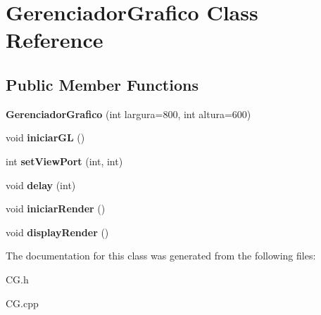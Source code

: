 \hypertarget{classGerenciadorGrafico}{\section{Gerenciador\-Grafico Class Reference}
\label{classGerenciadorGrafico}
}
\subsection*{Public Member Functions}
\begin{DoxyCompactItemize}
\item 
\hypertarget{classGerenciadorGrafico_a0213dce4e0ea77b2b1b2ee4833f9ef5c}{{\bfseries Gerenciador\-Grafico} (int largura=800, int altura=600)}\label{classGerenciadorGrafico_a0213dce4e0ea77b2b1b2ee4833f9ef5c}

\item 
\hypertarget{classGerenciadorGrafico_a880153d59789958ae68cebe650a6063f}{void {\bfseries iniciar\-G\-L} ()}\label{classGerenciadorGrafico_a880153d59789958ae68cebe650a6063f}

\item 
\hypertarget{classGerenciadorGrafico_a220eb59ca4dfebd111c10e7b6f3e1a65}{int {\bfseries set\-View\-Port} (int, int)}\label{classGerenciadorGrafico_a220eb59ca4dfebd111c10e7b6f3e1a65}

\item 
\hypertarget{classGerenciadorGrafico_aa0b7c377a12fffdbc382dc72c3384c28}{void {\bfseries delay} (int)}\label{classGerenciadorGrafico_aa0b7c377a12fffdbc382dc72c3384c28}

\item 
\hypertarget{classGerenciadorGrafico_a81a942fc91012655361c466d182b296c}{void {\bfseries iniciar\-Render} ()}\label{classGerenciadorGrafico_a81a942fc91012655361c466d182b296c}

\item 
\hypertarget{classGerenciadorGrafico_a542235e066f0653ef86014803fde262a}{void {\bfseries display\-Render} ()}\label{classGerenciadorGrafico_a542235e066f0653ef86014803fde262a}

\end{DoxyCompactItemize}


The documentation for this class was generated from the following files\-:\begin{DoxyCompactItemize}
\item 
C\-G.\-h\item 
C\-G.\-cpp\end{DoxyCompactItemize}
